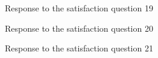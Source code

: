 \documentclass[12pt,oneside,openright,a4paper]{cpe-english-project}
\begin{document}
\begin{figure}[!h]\centering {} \caption{Response to the satisfaction question 19} \end{figure}
\begin{figure}[!h]\centering {} \caption{Response to the satisfaction question 20} \end{figure}
\begin{figure}[!h]\centering {} \caption{Response to the satisfaction question 21} \end{figure}
\end{document}
